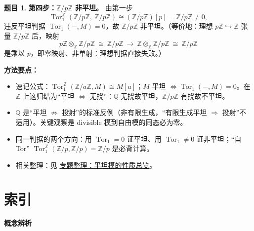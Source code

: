 \documentclass[a4paper]{ctexart}
\theoremstyle{definition}
\newtheorem{example}{题目}[section]
\theoremstyle{analysis}
\theoremstyle{plain}
\begin{document}
\begin{example}
\textbf{第四步：\(\mathbb Z/p\mathbb Z\) 非平坦。} 由第一步
\[
  \operatorname{Tor}_1^{\mathbb Z}(\mathbb Z/p\mathbb Z,\ \mathbb Z/p\mathbb Z)
  \cong(\mathbb Z/p\mathbb Z)[p]=\mathbb Z/p\mathbb Z\neq 0,
\]
违反平坦判据 \(\operatorname{Tor}_1(-,M)=0\)，故 \(\mathbb Z/p\mathbb Z\) 非平坦。（等价地：理想 \(p\mathbb Z\hookrightarrow\mathbb Z\) 张量 \(\mathbb Z/p\mathbb Z\) 后，映射
\[
  p\mathbb Z\otimes_{\mathbb Z}\mathbb Z/p\mathbb Z\ \cong\ \mathbb Z/p\mathbb Z
  \ \longrightarrow\ \mathbb Z\otimes_{\mathbb Z}\mathbb Z/p\mathbb Z\ \cong\ \mathbb Z/p\mathbb Z
\]
是乘以 \(p\)，即零映射、非单射：理想判据直接失败。）

\textbf{方法要点：}
\begin{itemize}
  \item 速记公式：\(\operatorname{Tor}_1^{\mathbb Z}(\mathbb Z/a\mathbb Z,M)\cong M[a]\)；\(M\) 平坦 \(\iff\operatorname{Tor}_1(-,M)=0\)。在 \(\mathbb Z\) 上这归结为“平坦 \(\iff\) 无挠”：\(\mathbb Q\) 无挠故平坦，\(\mathbb Z/p\mathbb Z\) 有挠故不平坦。
  \item \(\mathbb Q\) 是“平坦 \(\not\Rightarrow\) 投射”的标准反例（非有限生成，“有限生成平坦 \(\Rightarrow\) 投射”不适用）。关键观察是 divisible 模到自由模的同态必为零。
  \item 同一判据的两个方向：用 \(\operatorname{Tor}_1=0\) 证平坦、用 \(\operatorname{Tor}_1\neq 0\) 证非平坦；“自 Tor” \(\operatorname{Tor}_1^{\mathbb Z}(\mathbb Z/p,\mathbb Z/p)=\mathbb Z/p\) 是必背计算。
  \item 相关整理：见 \hyperref[subsec:topic-flat-modules]{专题整理：平坦模的性质总览}。
\end{itemize}
\end{example}


\newpage

\section*{索引}

\noindent\textbf{概念辨析}
\end{document}
